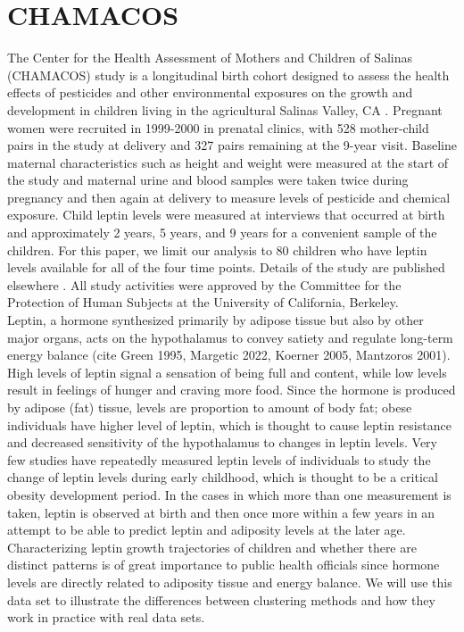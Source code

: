 \documentclass[11pt]{article}
\begin{document}
\section{CHAMACOS}
The Center for the Health Assessment of Mothers and Children of Salinas (CHAMACOS) study is a longitudinal birth cohort designed to assess the health effects of pesticides and other environmental exposures on the growth and development in children living in the agricultural Salinas Valley, CA \cite{eskenazi2004,eskenazi2005}. Pregnant women were recruited in 1999-2000 in prenatal clinics, with 528 mother-child pairs in the study at delivery and 327 pairs remaining at the 9-year visit. Baseline maternal characteristics such as height and weight were measured at the start of the study and maternal urine and blood samples were taken twice during pregnancy and then again at delivery to measure levels of pesticide and chemical exposure. Child leptin levels were measured at interviews that occurred at birth and approximately 2 years, 5 years, and 9 years for a convenient sample of the children. For this paper, we limit our analysis to 80 children who have leptin levels available for all of the four time points. Details of the study are published elsewhere \cite{eskenazi2003}. All study activities were approved by the Committee for the Protection of Human Subjects at the University of California, Berkeley. \\

Leptin, a hormone synthesized primarily by adipose tissue but also by other major organs, acts on the hypothalamus to convey satiety and regulate long-term energy balance (cite Green 1995, Margetic 2022, Koerner 2005, Mantzoros 2001). High levels of leptin signal a sensation of being full and content, while low levels result in feelings of hunger and craving more food. Since the hormone is produced by adipose (fat) tissue, levels are proportion to amount of body fat; obese individuals have higher level of leptin, which is thought to cause leptin resistance and decreased sensitivity of the hypothalamus to changes in leptin levels. Very few studies have repeatedly measured leptin levels of individuals to study the change of leptin levels during early childhood, which is thought to be a critical obesity development period. In the cases in which more than one measurement is taken, leptin is observed at birth and then once more within a few years in an attempt to be able to predict leptin and adiposity levels at the later age. Characterizing leptin growth trajectories of children and whether there are distinct patterns is of great importance to public health officials since hormone levels are directly related to adiposity tissue and energy balance. We will use this data set to illustrate the differences between clustering methods and how they work in practice with real data sets.\\
\end{document}
